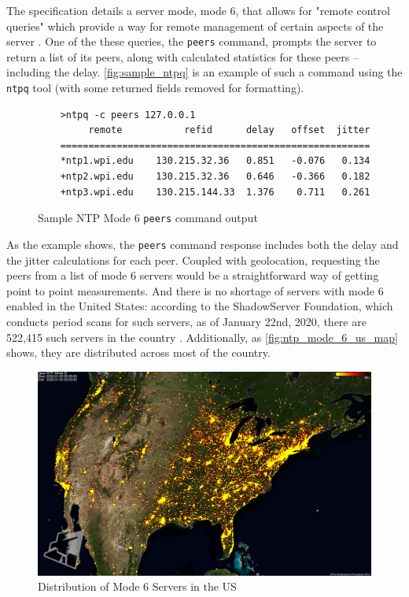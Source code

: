 The \ntp specification details a server mode, mode 6, that allows for "remote control queries" which provide a way for remote management of certain aspects of the server \cite{Haberman2019Control4}. One of the these queries, the \texttt{peers} command, prompts the server to return a list of its peers, along with calculated statistics for these peers -- including the delay. \autoref{fig:sample_ntpq} is an example of such a command using the \texttt{ntpq} tool (with some returned fields removed for formatting).

\begin{figure}[h]
    \centering
    \begin{verbatim}
    >ntpq -c peers 127.0.0.1
         remote           refid      delay   offset  jitter
    =======================================================
    *ntp1.wpi.edu    130.215.32.36   0.851   -0.076   0.134
    +ntp2.wpi.edu    130.215.32.36   0.646   -0.366   0.182
    +ntp3.wpi.edu    130.215.144.33  1.376    0.711   0.261
    \end{verbatim}
    \caption{Sample NTP Mode 6 \texttt{peers} command output}
    \label{fig:sample_ntpq}
\end{figure}

As the example shows, the \texttt{peers} command response includes both the delay and the jitter calculations for each peer. Coupled with \ip geolocation, requesting the peers from a list of mode 6 \ntp servers would be a straightforward way of getting point to point measurements. And there is no shortage of \ntp servers with mode 6 enabled in the United States: according to the ShadowServer Foundation, which conducts period scans for such servers, as of January 22nd, 2020, there are 522,415 such servers in the country \cite{TheShadowserverFoundationNTPProject}. Additionally, as \autoref{fig:ntp_mode_6_us_map} shows, they are distributed across most of the country.

\begin{figure}[H]
    \centering
    \includegraphics[width=\textwidth]{images/ntpversion_united_states_current.jpg}
    \caption{Distribution of \ntp Mode 6 Servers in the US}
    \label{fig:ntp_mode_6_us_map}
\end{figure}

